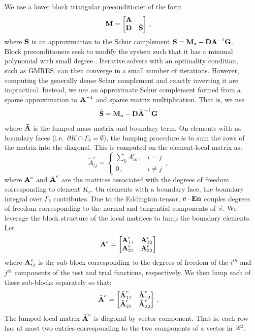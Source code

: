 \documentclass[../doc.tex]{subfiles}
\begin{document}
We use a lower block triangular preconditioner of the form 
	\begin{equation} \label{rtvef:block_prec}
		\boldsymbol{\mathrm{M}} = \begin{bmatrix} 
			\boldsymbol{\mathrm{A}} \\ \boldsymbol{\mathrm{D}} & \tilde{\boldsymbol{\mathrm{S}}}
		\end{bmatrix} \,,
	\end{equation}
where $\tilde{\boldsymbol{\mathrm{S}}}$ is an approximation to the Schur complement $\boldsymbol{\mathrm{S}} = \boldsymbol{\mathrm{M}}_a - \boldsymbol{\mathrm{D}}\boldsymbol{\mathrm{A}}^{-1}\boldsymbol{\mathrm{G}}$. Block preconditioners seek to modify the system such that it has a minimal polynomial with small degree \cite{benzi_golub_liesen_2005}. Iterative solvers with an optimality condition, such as GMRES, can then converge in a small number of iterations. However, computing the generally dense Schur complement and exactly inverting it are impractical. Instead, we use an approximate Schur complement formed from a sparse approximation to $\boldsymbol{\mathrm{A}}^{-1}$ and sparse matrix multiplication. That is, we use
	\begin{equation}
		\tilde{\boldsymbol{\mathrm{S}}} = \boldsymbol{\mathrm{M}}_a - \boldsymbol{\mathrm{D}}\tilde{\boldsymbol{\mathrm{A}}}^{-1}\boldsymbol{\mathrm{G}} 
	\end{equation}
where $\tilde{\boldsymbol{\mathrm{A}}}$ is the lumped mass matrix and boundary term. On elements with no boundary faces (i.e.~$\partial K \cap \Gamma_b = \emptyset$), the lumping procedure is to sum the rows of the matrix into the diagonal. This is computed on the element-local matrix as: 
	\begin{equation}
		\tilde{A}^e_{ij} = \begin{cases}
			\sum_{k} A_{ik}^e \,, & i=j \\ 
			0 \,, & i\neq j 
		\end{cases} \,, 
	\end{equation}
where $\boldsymbol{\mathrm{A}}^e$ and $\tilde{\boldsymbol{\mathrm{A}}}^e$ are the matrices associated with the degrees of freedom corresponding to element $K_e$. 
On elements with a boundary face, the boundary integral over $\Gamma_b$ contributes. Due to the Eddington tensor, $\boldsymbol{v}\cdot\boldsymbol{\mathrm{E}}\boldsymbol{\mathrm{n}}$ couples degrees of freedom corresponding to the normal and tangential components of $\vec{v}$. We leverage the block structure of the local matrices to lump the boundary elements. Let 
	\begin{equation}
		\boldsymbol{\mathrm{A}}^e = \begin{bmatrix} 
			\boldsymbol{\mathrm{A}}^e_{11} & \boldsymbol{\mathrm{A}}^e_{12} \\ 
			\boldsymbol{\mathrm{A}}^e_{21} & \boldsymbol{\mathrm{A}}^e_{22} 
		\end{bmatrix}
	\end{equation}
where $\boldsymbol{\mathrm{A}}^e_{ij}$ is the sub-block corresponding to the degrees of freedom of the $i^{th}$ and $j^{th}$ components of the test and trial functions, respectively. We then lump each of these sub-blocks separately so that: 
	\begin{equation}
		\tilde{\boldsymbol{\mathrm{A}}}^e = \begin{bmatrix} 
			\tilde{\boldsymbol{\mathrm{A}}}^e_{11} & \tilde{\boldsymbol{\mathrm{A}}}^e_{12} \\ 
			\tilde{\boldsymbol{\mathrm{A}}}^e_{21} & \tilde{\boldsymbol{\mathrm{A}}}^e_{22} 			
		\end{bmatrix} \,. 
	\end{equation}
The lumped local matrix $\tilde{\boldsymbol{\mathrm{A}}}^e$ is diagonal by vector component. That is, each row has at most two entries corresponding to the two components of a vector in $\mathbb{R}^2$. 
\end{document}
